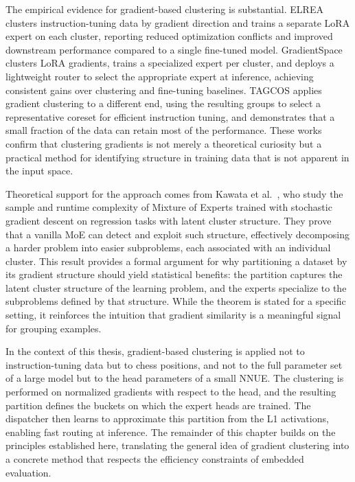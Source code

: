 The empirical evidence for gradient-based clustering is substantial. ELREA clusters instruction-tuning data by gradient direction and trains a separate LoRA expert on each cluster, reporting reduced optimization conflicts and improved downstream performance compared to a single fine-tuned model. GradientSpace clusters LoRA gradients, trains a specialized expert per cluster, and deploys a lightweight router to select the appropriate expert at inference, achieving consistent gains over clustering and fine-tuning baselines. TAGCOS applies gradient clustering to a different end, using the resulting groups to select a representative coreset for efficient instruction tuning, and demonstrates that a small fraction of the data can retain most of the performance. These works confirm that clustering gradients is not merely a theoretical curiosity but a practical method for identifying structure in training data that is not apparent in the input space.

Theoretical support for the approach comes from Kawata et al.~\cite{kawata2025moe}, who study the sample and runtime complexity of Mixture of Experts trained with stochastic gradient descent on regression tasks with latent cluster structure. They prove that a vanilla MoE can detect and exploit such structure, effectively decomposing a harder problem into easier subproblems, each associated with an individual cluster. This result provides a formal argument for why partitioning a dataset by its gradient structure should yield statistical benefits: the partition captures the latent cluster structure of the learning problem, and the experts specialize to the subproblems defined by that structure. While the theorem is stated for a specific setting, it reinforces the intuition that gradient similarity is a meaningful signal for grouping examples.

In the context of this thesis, gradient-based clustering is applied not to instruction-tuning data but to chess positions, and not to the full parameter set of a large model but to the head parameters of a small NNUE. The clustering is performed on normalized gradients with respect to the head, and the resulting partition defines the buckets on which the expert heads are trained. The dispatcher then learns to approximate this partition from the L1 activations, enabling fast routing at inference. The remainder of this chapter builds on the principles established here, translating the general idea of gradient clustering into a concrete method that respects the efficiency constraints of embedded evaluation.

